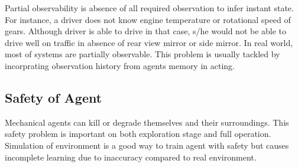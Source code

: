 Partial observability is absence of all required observation to infer instant state. 
For instance, a driver does not know engine temperature or rotational speed of gears. 
Although driver is able to drive in that case, s/he would not be able to drive well on traffic in absence of rear view mirror or side mirror. 
In real world, most of systems are partially observable. 
This problem is usually tackled by incorprating observation history from agents memory in acting. 

\subsection{Safety of Agent}

Mechanical agents can kill or degrade themselves and their surroundings. 
This safety problem is important on both exploration stage and full operation. 
Simulation of environment is a good way to train agent with safety but causes incomplete learning 
due to inaccuracy compared to real environment. 
